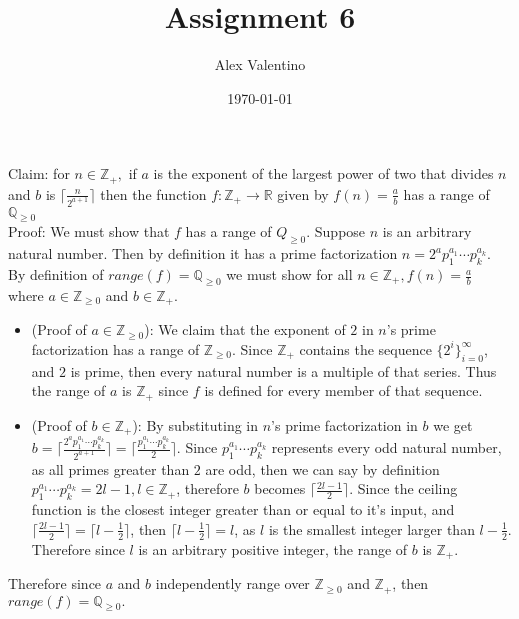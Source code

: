 \documentclass[12pt, letterpaper]{article}
\date{\today}
\author{Alex Valentino}
\title{Assignment 6}
\newcommand{\Z}{\mathbb{Z}}
\newcommand{\R}{\mathbb{R}}
\newcommand{\Q}{\mathbb{Q}}
\begin{document}
	Claim: for $n \in \Z_+,$ if $a$ is the exponent of the largest power of two that divides $n$ and $b$ is $\lceil \frac{n}{2^{a+1}} \rceil$ then the function $f : \Z_+ \to \R$ given by $f(n) = \frac{a}{b}$ has a range of $\Q_{\geq0}$\\
	Proof: We must show that $f$ has a range of $Q_{\geq 0}$.  Suppose $n$ is an arbitrary natural number.  Then by definition it has a prime factorization $n=2^ap_1^{a_1}\cdots p_k^{a_k}$.  By definition of $range(f) = \Q_{\geq 0}$ we must show for all $n \in \Z_+, f(n) = \frac{a}{b}$ where $a \in \Z_{\geq 0}$ and $b \in \Z_+.$  
	\begin{itemize}
		\item (Proof of $a \in \Z_{\geq 0}$):   We claim that the exponent of $2$ in $n$'s prime factorization has a range of $\Z_{\geq 0}$.  Since $\Z_{+}$ contains the sequence $\{2^i\}_{i=0}^\infty$, and $2$ is prime, then every natural number is a multiple of that series.  Thus the range of $a$ is $\Z_+$ since $f$ is defined for every member of that sequence.  
		\item (Proof of $b \in \Z_+$):  By substituting in $n$'s prime factorization in $b$ we get $b = \lceil \frac{2^ap_1^{a_1}\cdots p_k^{a_k}}{2^{a+1}} \rceil = \lceil \frac{p_1^{a_1}\cdots p_k^{a_k}}{2} \rceil$.  Since $p_1^{a_1}\cdots p_k^{a_k}$ represents every odd natural number, as all primes greater than $2$  are odd, then we can say by definition $p_1^{a_1}\cdots p_k^{a_k} = 2l-1, l \in \Z_+$, therefore $b$ becomes $\lceil \frac{2l-1}{2} \rceil.$  
		Since the ceiling function is the closest integer greater than or equal to it's input, and $\lceil \frac{2l-1}{2} \rceil = \lceil l - \frac{1}{2} \rceil$, then $\lceil l - \frac{1}{2} \rceil = l$, as $l$ is the smallest integer larger than $l -\frac{1}{2}$.  Therefore since $l$ is an arbitrary positive integer, the range of $b$ is $\Z_+.$
	\end{itemize}
	Therefore since $a$ and $b$ independently range over $\Z_{\geq 0}$ and $\Z_+$, then $range(f) = \Q_{\geq 0}.$
\end{document}
